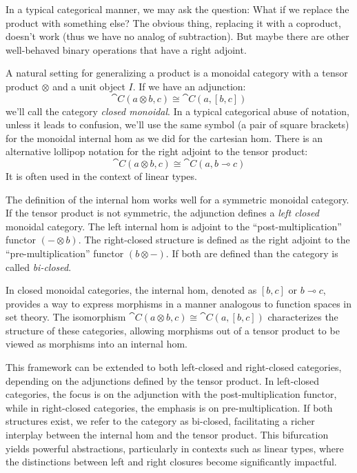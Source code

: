 \documentclass[DaoFP]{subfiles}
\begin{document}
In a typical categorical manner, we may ask the question: What if we replace the product with something else? The obvious thing, replacing it with a coproduct, doesn't work (thus we have no analog of subtraction). But maybe there are other well-behaved binary operations that have a right adjoint.

A natural setting for generalizing a product is a monoidal category with a tensor product $\otimes$ and a unit object $I$. If we have an adjunction:
\[ \cat C (a \otimes b, c) \cong \cat C (a, [b, c]) \]
we'll call the category \emph{closed monoidal}. In a typical categorical abuse of notation, unless it leads to confusion, we'll use the same symbol (a pair of square brackets)  for the monoidal internal hom as we did for the cartesian hom. There is an alternative lollipop notation for the right adjoint to the tensor product:
\[ \cat C (a \otimes b, c) \cong \cat C (a, b \multimap c) \]
It is often used in the context of linear types.

The definition of the internal hom works well for a symmetric monoidal category. If the tensor product is not symmetric, the adjunction defines a \emph{left closed} monoidal category. The left internal hom is adjoint to the ``post-multiplication'' functor $(- \otimes b)$. The right-closed structure is defined as the right adjoint to the ``pre-multiplication'' functor $(b \otimes -)$. If both are defined than the category is called \emph{bi-closed}.


In closed monoidal categories, the internal hom, denoted as \([b, c]\) or \(b \multimap c\), provides a way to express morphisms in a manner analogous to function spaces in set theory. The isomorphism \(\cat C(a \otimes b, c) \cong \cat C(a, [b, c])\) characterizes the structure of these categories, allowing morphisms out of a tensor product to be viewed as morphisms into an internal hom.

This framework can be extended to both left-closed and right-closed categories, depending on the adjunctions defined by the tensor product. In left-closed categories, the focus is on the adjunction with the post-multiplication functor, while in right-closed categories, the emphasis is on pre-multiplication. If both structures exist, we refer to the category as bi-closed, facilitating a richer interplay between the internal hom and the tensor product. This bifurcation yields powerful abstractions, particularly in contexts such as linear types, where the distinctions between left and right closures become significantly impactful.
\end{document}
